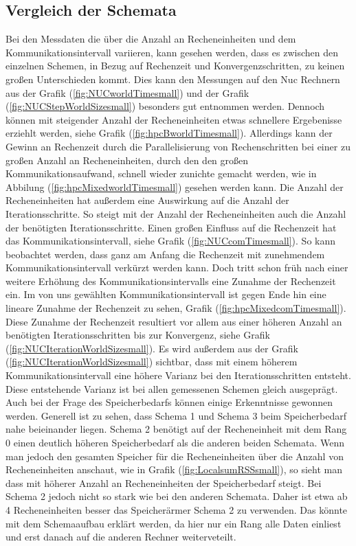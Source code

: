 \subsection{Vergleich der Schemata}
Bei den Messdaten die \"uber die Anzahl an Recheneinheiten und dem Kommunikationsintervall variieren, kann gesehen werden, dass es zwischen den einzelnen Schemen, in Bezug auf Rechenzeit und Konvergenzschritten, zu keinen gro\ss{}en Unterschieden kommt. Dies kann den Messungen auf den Nuc Rechnern aus der Grafik (\ref{fig:NUCworldTimesmall}) und der Grafik (\ref{fig:NUCStepWorldSizesmall}) besonders gut entnommen werden. Dennoch k\"onnen mit steigender Anzahl der Recheneinheiten  etwas schnellere Ergebenisse erziehlt werden, siehe Grafik (\ref{fig:hpcBworldTimesmall}). Allerdings kann der Gewinn an Rechenzeit durch die Parallelisierung von Rechenschritten bei einer zu gro\ss{}en Anzahl an Recheneinheiten, durch den den gro\ss{}en Kommunikationsaufwand, schnell wieder zunichte gemacht werden, wie in Abbilung (\ref{fig:hpcMixedworldTimesmall}) gesehen werden kann. Die Anzahl der Recheneinheiten hat au\ss{}erdem eine Auswirkung auf die Anzahl der Iterationsschritte. So steigt mit der Anzahl der Recheneinheiten auch die Anzahl der ben\"otigten Iterationsschritte. Einen gro\ss{}en Einfluss auf die Rechenzeit hat das Kommunikationsintervall, siehe  Grafik (\ref{fig:NUCcomTimesmall}). So kann beobachtet werden, dass ganz am Anfang die Rechenzeit mit zunehmendem Kommunikationsintervall verk\"urzt werden kann. Doch tritt schon fr\"uh nach einer weitere Erh\"ohung des Kommunikationsintervalls eine Zunahme der Rechenzeit ein. Im von uns gew\"ahlten Kommunikationsintervall ist gegen Ende hin eine lineare Zunahme der Rechenzeit zu sehen, Grafik (\ref{fig:hpcMixedcomTimesmall}). Diese Zunahme der Rechenzeit resultiert vor allem aus einer h\"oheren Anzahl an ben\"otigten Iterationsschritten bis zur Konvergenz, siehe Grafik (\ref{fig:NUCIterationWorldSizesmall}). Es wird au\ss{}erdem aus der Grafik (\ref{fig:NUCIterationWorldSizesmall}) sichtbar, dass mit einem h\"oherem Kommunikationsintervall eine h\"ohere Varianz bei den Iterationsschritten entsteht. Diese entstehende Varianz ist bei allen gemessenen Schemen gleich ausgepr\"agt.\\ Auch bei der Frage des Speicherbedarfs k\"onnen einige Erkenntnisse gewonnen werden. Generell ist zu sehen, dass Schema 1 und Schema 3 beim Speicherbedarf nahe beieinander liegen. Schema 2 ben\"otigt auf der Recheneinheit mit dem Rang 0 einen deutlich h\"oheren Speicherbedarf als die anderen beiden Schemata. Wenn man jedoch den gesamten Speicher f\"ur die Recheneinheiten \"uber die Anzahl von Recheneinheiten anschaut, wie in Grafik (\ref{fig:LocalsumRSSsmall}), so sieht man dass mit h\"oherer Anzahl an Recheneinheiten der Speicherbedarf steigt. Bei Schema 2 jedoch nicht so stark wie bei den anderen Schemata. Daher ist etwa ab 4 Recheneinheiten besser das Speicher\"armer Schema 2 zu verwenden. Das k\"onnte mit dem Schemaaufbau erkl\"art werden, da hier nur ein Rang alle Daten einliest und erst danach auf die anderen Rechner weiterveteilt.\\
